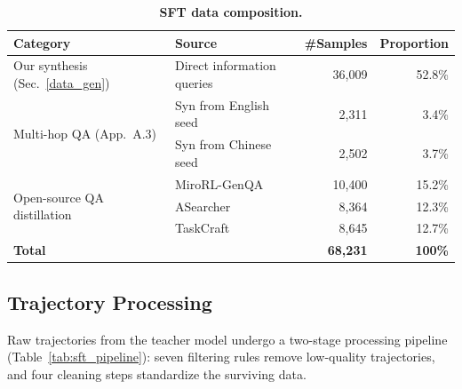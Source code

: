 \documentclass{article} %
\theoremstyle{plain}
\theoremstyle{definition}
\theoremstyle{remark}
\begin{document}
\begin{table}[H]
    \centering
    \small
    \setlength{\tabcolsep}{6pt}
    \renewcommand{\arraystretch}{1.1}
    \begin{tabular}{llrr}
        \toprule
        \textbf{Category} & \textbf{Source} & \textbf{\#Samples} & \textbf{Proportion} \\
        \midrule
        \multirow{1}{*}{Our synthesis (Sec.~\ref{data_gen})} & Direct information queries & 36,009 & 52.8\% \\
        \midrule
        \multirow{2}{*}{Multi-hop QA (App.~A.3)} & Syn from English seed& 2,311 & 3.4\% \\
                                                   & Syn from Chinese seed& 2,502 & 3.7\% \\
        \midrule
        \multirow{3}{*}{Open-source QA distillation} & MiroRL-GenQA~\citep{2025mirorl} & 10,400 & 15.2\% \\
                                                   & ASearcher~\citep{gao2025beyond} & 8,364 & 12.3\% \\
                                                   & TaskCraft~\citep{shi2025taskcraft} & 8,645 & 12.7\% \\
        \midrule
        \multicolumn{2}{l}{\textbf{Total}} & \textbf{68,231} & \textbf{100\%} \\
        \bottomrule
    \end{tabular}
    \caption{\textbf{SFT data composition.}}
    \label{tab:sft_data_sources}
\end{table}

\subsection{Trajectory Processing}

Raw trajectories from the teacher model undergo a two-stage processing pipeline (Table~\ref{tab:sft_pipeline}): seven filtering rules remove low-quality trajectories, and four cleaning steps standardize the surviving data.
\end{document}
